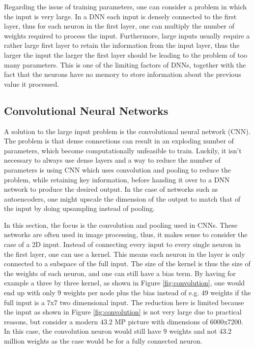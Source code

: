 \documentclass[11pt,a4paper]{article} %
\numberwithin{equation}{section}
\begin{document}
    	Regarding the issue of training parameters, one can consider a problem in which the input is very large. In a DNN each input is densely connected to the first layer, thus for each neuron in the first layer, one can multiply the number of weights required to process the input. Furthermore, large inputs usually require a rather large first layer to retain the information from the input layer, thus the larger the input the larger the first layer should be leading to the problem of too many parameters. This is one of the limiting factors of DNNs, together with the fact that the neurons have no memory to store information about the previous value it processed.
    	
    	\subsection{Convolutional Neural Networks}
    	A solution to the large input problem is the convolutional neural network (CNN). The problem is that dense connections can result in an exploding number of parameters, which become computationally unfeasible to train. Luckily, it isn't necessary to always use dense layers and a way to reduce the number of parameters is using CNN which uses convolution and pooling to reduce the problem, while retaining key information, before handing it over to a DNN network to produce the desired output. In the case of networks such as autoencoders, one might upscale the dimension of the output to match that of the input by doing upsampling instead of pooling.
    	
    	In this section, the focus is the convolution and pooling used in CNNs. These networks are often used in image processing, thus, it makes sense to consider the case of a 2D input. Instead of connecting every input to every single neuron in the first layer, one can use a kernel. This means each neuron in the layer is only connected to a subspace of the full input. The size of the kernel is thus the size of the weights of each neuron, and one can still have a bias term. By having for example a three by three kernel, as shown in Figure \ref{fig:convolution}, one would end up with only 9 weights per node plus the bias instead of e.g. 49 weights if the full input is a 7x7 two dimensional input. The reduction here is limited because the input as shown in Figure \ref{fig:convolution} is not very large due to practical reasons, but consider a modern 43.2 MP picture with dimensions of 6000x7200. In this case, the convolution neuron would still have 9 weights and not 43.2 million weights as the case would be for a fully connected neuron.  
    	
\end{document}
